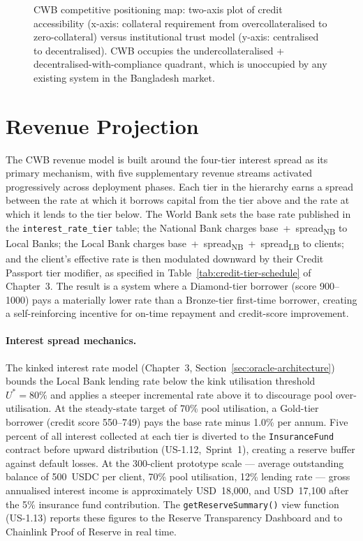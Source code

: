 \begin{figure}[H]
\centering
{}
\caption{CWB competitive positioning map: two-axis plot of credit accessibility
(x-axis: collateral requirement from overcollateralised to zero-collateral)
versus institutional trust model (y-axis: centralised to decentralised).
CWB occupies the undercollateralised + decentralised-with-compliance quadrant,
which is unoccupied by any existing system in the Bangladesh market.}
\label{fig:competitive-positioning}
\end{figure}

\section{Revenue Projection}
\label{sec:revenue-projection}

The CWB revenue model is built around the four-tier interest spread as its
primary mechanism, with five supplementary revenue streams activated
progressively across deployment phases. Each tier in the hierarchy earns a
spread between the rate at which it borrows capital from the tier above and
the rate at which it lends to the tier below. The World Bank sets the base
rate published in the \texttt{interest\_rate\_tier} table; the National Bank
charges base~+~spread\textsubscript{NB} to Local Banks; the Local Bank
charges base~+~spread\textsubscript{NB}~+~spread\textsubscript{LB} to
clients; and the client's effective rate is then modulated downward by their
Credit Passport tier modifier, as specified in
Table~\ref{tab:credit-tier-schedule} of Chapter~3. The result is a system
where a Diamond-tier borrower (score 900--1000) pays a materially lower rate
than a Bronze-tier first-time borrower, creating a self-reinforcing incentive
for on-time repayment and credit-score improvement.

\paragraph{Interest spread mechanics.}
The kinked interest rate model (Chapter~3, Section~\ref{sec:oracle-architecture})
bounds the Local Bank lending rate below the kink utilisation threshold
$U^* = 80\%$ and applies a steeper incremental rate above it to discourage
pool over-utilisation. At the steady-state target of 70\% pool utilisation, a
Gold-tier borrower (credit score 550--749) pays the base rate minus 1.0\%
per annum. Five percent of all interest collected at each tier is diverted to
the \texttt{InsuranceFund} contract before upward distribution
(US-1.12,~Sprint~1), creating a reserve buffer against default losses. At
the 300-client prototype scale --- average outstanding balance of 500~USDC
per client, 70\% pool utilisation, 12\% lending rate --- gross annualised
interest income is approximately USD~18{,}000, and USD~17{,}100 after the
5\% insurance fund contribution. The \texttt{getReserveSummary()} view
function (US-1.13) reports these figures to the Reserve Transparency
Dashboard and to Chainlink Proof of Reserve in real time.

